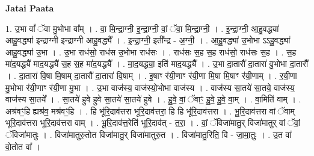 \documentclass[17pt]{extarticle}
\begin{document}
\textbf{Jatai Paata} \newline

1. उ॒भा वां᳚ ॅवा मु॒भोभा वा᳚म् । . वा॒ मि॒न्द्रा॒ग्नी॒ इ॒न्द्रा॒ग्नी॒ वां॒ ॅवा॒ मि॒न्द्रा॒ग्नी॒ । . इ॒न्द्रा॒ग्नी॒ आ॒हु॒वद्ध्या॑ आहु॒वद्ध्या॑ इन्द्राग्नी इन्द्राग्नी आहु॒वद्ध्यै᳚ । . इ॒न्द्रा॒ग्नी॒ इती᳚न्द्र - अ॒ग्नी॒ । . आ॒हु॒वद्ध्या॑ उ॒भोभा ऽऽहु॒वद्ध्या॑ आहु॒वद्ध्या॑ उ॒भा । . उ॒भा राध॑सो॒ राध॑स उ॒भोभा राध॑सः । . राध॑सः स॒ह स॒ह राध॑सो॒ राध॑सः स॒ह । . स॒ह मा॑द॒यद्ध्यै॑ माद॒यद्ध्यै॑ स॒ह स॒ह मा॑द॒यद्ध्यै᳚ । . मा॒द॒यद्ध्या॒ इति॑ माद॒यद्ध्यै᳚ । . उ॒भा दा॒तारौ॑ दा॒तारा॑ वु॒भोभा दा॒तारौ᳚ । . दा॒तारा॑ वि॒षा मि॒षाम् दा॒तारौ॑ दा॒तारा॑ वि॒षाम् । . इ॒षाꣳ र॑यी॒णाꣳ र॑यी॒णा मि॒षा मि॒षाꣳ र॑यी॒णाम् । . र॒यी॒णा मु॒भोभा र॑यी॒णाꣳ र॑यी॒णा मु॒भा । . उ॒भा वाज॑स्य॒ वाज॑स्यो॒भोभा वाज॑स्य । . वाज॑स्य सा॒तये॑ सा॒तये॒ वाज॑स्य॒ वाज॑स्य सा॒तये᳚ । . सा॒तये॑ हुवे हुवे सा॒तये॑ सा॒तये॑ हुवे । . हु॒वे॒ वां॒ ॅवाꣳ॒॒ हु॒वे॒ हु॒वे॒ वा॒म् । . वा॒मिति॑ वाम् । . अश्र॑वꣳ॒॒हि ह्यश्र॑व॒ मश्र॑वꣳ॒॒हि । . हि भू॑रि॒दाव॑त्तरा भूरि॒दाव॑त्तरा॒ हि हि भू॑रि॒दाव॑त्तरा । . भू॒रि॒दाव॑त्तरा वां ॅवाम् भूरि॒दाव॑त्तरा भूरि॒दाव॑त्तरा वाम् । . भू॒रि॒दाव॑त्त॒रेति॑ भूरि॒दाव॑त् - त॒रा॒ । . वां॒ ॅविजा॑मातु॒र् विजा॑मातुर् वां ॅवां॒ ॅविजा॑मातुः । . विजा॑मातुरु॒तोत विजा॑मातु॒र् विजा॑मातुरु॒त । . विजा॑मातु॒रिति॒ वि - जा॒मा॒तुः॒ । . उ॒त वा॑ वो॒तोत वा᳚ । \newline
\end{document}
